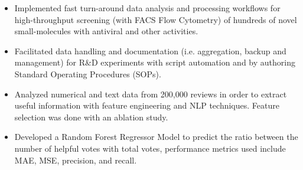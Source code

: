 \documentclass[10pt,a4paper]{altacv}
\begin{document}


\begin{itemize}
    \item   \small{Implemented fast turn-around data analysis and processing workflows for high-throughput screening (with FACS Flow Cytometry) of hundreds of novel small-molecules with antiviral and other activities.}
    \item   \small{Facilitated data handling and documentation (i.e. aggregation, backup and management) for R\&D experiments with script automation and by authoring Standard Operating Procedures (SOPs).}
    
\end{itemize}

\medskip







\begin{itemize}
  \item \small Analyzed numerical and text data from 200,000 reviews in order to extract useful information with feature engineering and NLP techniques. Feature selection was done with an ablation study. 
    \item \small Developed a Random Forest Regressor Model to predict the ratio between the number of helpful votes with total votes, performance metrics used include MAE, MSE, precision, and recall. 
\end{itemize}
\end{document}
